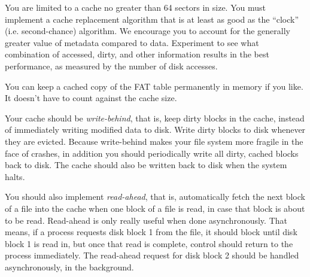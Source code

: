 \begin{enumerate}
    You are limited to a cache no greater than 64 sectors in size. You must implement a cache replacement algorithm that is at least as good as the  ``clock'' (i.e. second-chance) algorithm. We encourage you to account for the generally greater value of metadata compared to data. Experiment to see what combination of accessed, dirty, and other information results in the best performance, as measured by the number of disk accesses. 
    
    You can keep a cached copy of the FAT table permanently in memory if you like. It doesn't have to count against the cache size. 
    

    Your cache should be \textit{write-behind}, that is, keep dirty blocks in the cache, instead of immediately writing modified data to disk. Write dirty blocks to disk whenever they are evicted. Because write-behind makes your file system more fragile in the face of crashes, in addition you should periodically write all dirty, cached blocks back to disk. The cache should also be written back to disk when the system halts.

    You should also implement \textit{read-ahead}, that is, automatically fetch the next block of a file into the cache when one block of a file is read, in case that block is about to be read. Read-ahead is only really useful when done asynchronously. That means, if a process requests disk block 1 from the file, it should block until disk block 1 is read in, but once that read is complete, control should return to the process immediately. The read-ahead request for disk block 2 should be handled asynchronously, in the background.
    
\end{enumerate}



